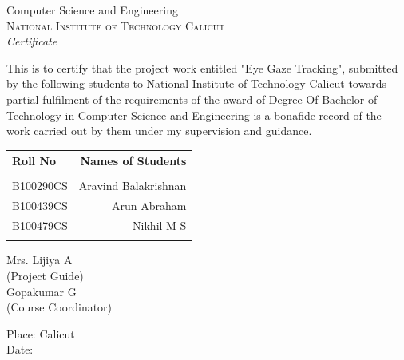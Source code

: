 \newpage
\thispagestyle{empty}

\begin{center}

\huge{Computer Science and Engineering}\\
\normalsize
\textsc{National Institute of Technology Calicut}\\[2cm]

\emph{\LARGE Certificate}\\[2.0cm]
\end{center}
\normalsize This is to certify that the project work entitled "Eye Gaze Tracking", submitted by the following students to National Institute of Technology Calicut towards partial fulfilment of the requirements of the award of Degree Of Bachelor of Technology in Computer Science and Engineering is a bonafide record of the work carried out by them under my supervision and guidance.\\[.5cm]

\begin{table}[h]
\centering
\begin{tabular}{lr}
Roll No & Names of Students  \\ \hline
\\
B100290CS & Aravind Balakrishnan \\
B100439CS & Arun Abraham \\ 
B100479CS & Nikhil M S \\
\\
\hline
\end{tabular}
\end{table}

\vfill


\begin{flushright}
Mrs. Lijiya A\\
(Project Guide)\\[1.5cm]
Gopakumar G\\
(Course Coordinator)\\
\end{flushright}

\begin{flushleft}
Place: Calicut \\
Date:

\end{flushleft}


